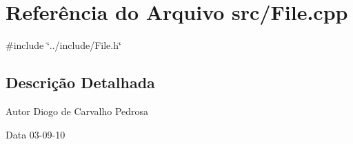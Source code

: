 \section{Referência do Arquivo src/File.cpp}
\label{File_8cpp}
{\ttfamily \#include \char`\"{}../include/File.h\char`\"{}}\par


\subsection{Descrição Detalhada}
\begin{DoxyAuthor}{Autor}
Diogo de Carvalho Pedrosa 
\end{DoxyAuthor}
\begin{DoxyDate}{Data}
03-\/09-\/10 
\end{DoxyDate}
